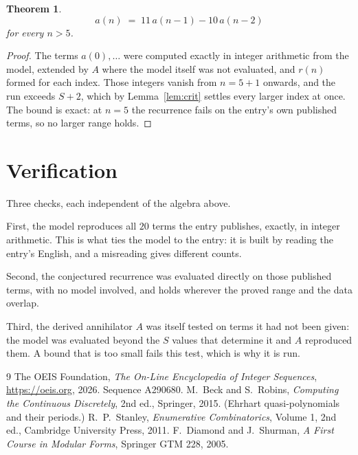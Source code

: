 \documentclass[11pt,a4paper]{article}
\theoremstyle{plain}
\newtheorem{theorem}{Theorem}
\theoremstyle{definition}
\begin{document}
\begin{theorem}
\[
a(n)\;=\;11\,a(n-1) - 10\,a(n-2)
\]
for every $n>5$.
\end{theorem}

\begin{proof}
The terms $a(0),\dots$ were computed exactly in integer arithmetic from the model, extended by
$A$ where the model itself was not evaluated, and $r(n)$ formed for each index. Those integers
vanish from $n=5+1$ onwards, and the run exceeds $S+2$, which by
Lemma~\ref{lem:crit} settles every larger index at once. The bound is exact: at $n=5$ the recurrence fails on the entry's own published terms, so no larger range holds.
\end{proof}

\section{Verification}

Three checks, each independent of the algebra above.

First, the model reproduces all $20$ terms the entry publishes, exactly, in integer
arithmetic. This is what ties the model to the entry: it is built by reading the entry's
English, and a misreading gives different counts.

Second, the conjectured recurrence was evaluated directly on those published terms, with no
model involved, and holds wherever the proved range and the data overlap.

Third, the derived annihilator $A$ was itself tested on terms it had not been given: the model
was evaluated beyond the $S$ values that determine it and $A$ reproduced them. A bound that is
too small fails this test, which is why it is run.

\begin{thebibliography}{9}
 The OEIS Foundation, \emph{The On-Line Encyclopedia of Integer
Sequences}, \url{https://oeis.org}, 2026. Sequence A290680.
 M.~Beck and S.~Robins, \emph{Computing the Continuous Discretely},
2nd ed., Springer, 2015. (Ehrhart quasi-polynomials and their periods.)
 R.~P.~Stanley, \emph{Enumerative Combinatorics}, Volume 1, 2nd ed.,
Cambridge University Press, 2011.
 F.~Diamond and J.~Shurman, \emph{A First Course in Modular Forms},
Springer GTM 228, 2005.
\end{thebibliography}
\end{document}
